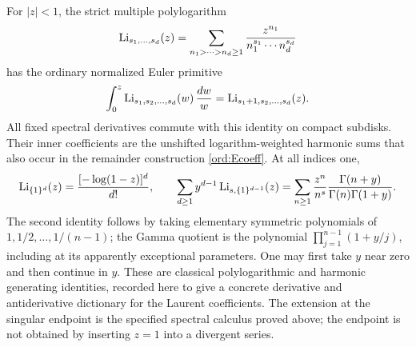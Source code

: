For $|z|<1$, the strict multiple polylogarithm
\[
 \operatorname{Li}_{s_1,\ldots,s_d}(z)=
 \sum_{n_1>\cdots>n_d\ge1}
       \frac{z^{n_1}}{n_1^{s_1}\cdots n_d^{s_d}}
\]
has the ordinary normalized Euler primitive
\begin{equation}\label{harm:primitive}
 \int_0^z\operatorname{Li}_{s_1,s_2,\ldots,s_d}(w)\,\frac{dw}{w}
       =\operatorname{Li}_{s_1+1,s_2,\ldots,s_d}(z).
\end{equation}
All fixed spectral derivatives commute with this identity on compact
subdisks. Their inner coefficients are the unshifted logarithm-weighted
harmonic sums that also occur in the remainder construction
\eqref{ord:Ecoeff}. At all indices one,
\begin{equation}\label{harm:allones}
 \operatorname{Li}_{\{1\}^d}(z)=\frac{[-\log(1-z)]^d}{d!},\qquad
 \sum_{d\ge1}y^{d-1}\operatorname{Li}_{s,\{1\}^{d-1}}(z)
 =\sum_{n\ge1}\frac{z^n}{n^s}
             \frac{\Gamma(n+y)}{\Gamma(n)\Gamma(1+y)}.
\end{equation}
The second identity follows by taking elementary symmetric
polynomials of $1,1/2,\ldots,1/(n-1)$; the Gamma quotient is the
polynomial $\prod_{j=1}^{n-1}(1+y/j)$, including at its apparently
exceptional parameters. One may first take $y$ near zero and then
continue in $y$. These are classical
polylogarithmic and harmonic generating identities, recorded here
to give a concrete derivative and antiderivative dictionary for the
Laurent coefficients. The extension at the singular endpoint is the
specified spectral calculus proved above; the endpoint is not obtained
by inserting $z=1$ into a divergent series.
